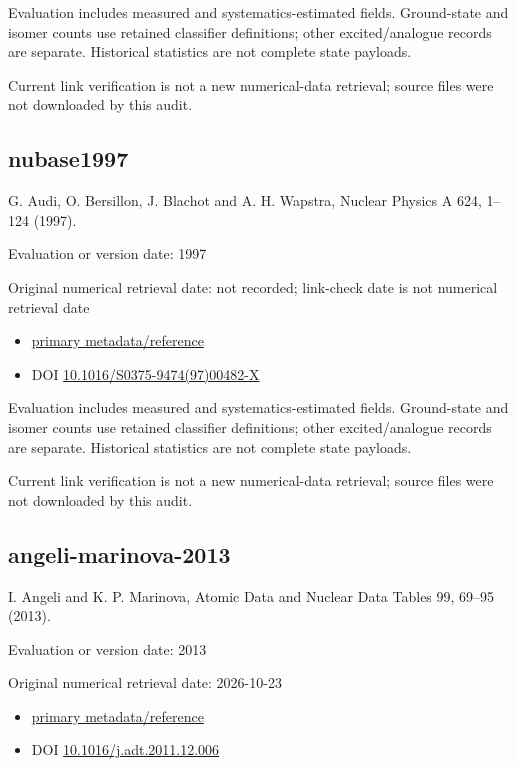 \documentclass[
  11pt,
  letterpaper,
]{article}
\providecommand{\tightlist}{%
  \setlength{\itemsep}{0pt}\setlength{\parskip}{0pt}}
\begin{document}
Evaluation includes measured and systematics-estimated fields.
Ground-state and isomer counts use retained classifier definitions;
other excited/analogue records are separate. Historical statistics are
not complete state payloads.

Current link verification is not a new numerical-data retrieval; source
files were not downloaded by this audit.

\subsection{nubase1997}\label{nubase1997}

G. Audi, O. Bersillon, J. Blachot and A. H. Wapstra, Nuclear Physics A
624, 1--124 (1997).

Evaluation or version date: 1997

Original numerical retrieval date: not recorded; link-check date is not
numerical retrieval date

\begin{itemize}
\tightlist
\item
  \href{https://www.sciencedirect.com/science/article/pii/S037594749700482X}{primary
  metadata/reference}
\item
  DOI
  \href{https://doi.org/10.1016/S0375-9474(97)00482-X}{10.1016/S0375-9474(97)00482-X}
\end{itemize}

Evaluation includes measured and systematics-estimated fields.
Ground-state and isomer counts use retained classifier definitions;
other excited/analogue records are separate. Historical statistics are
not complete state payloads.

Current link verification is not a new numerical-data retrieval; source
files were not downloaded by this audit.

\subsection{angeli-marinova-2013}\label{angeli-marinova-2013}

I. Angeli and K. P. Marinova, Atomic Data and Nuclear Data Tables 99,
69--95 (2013).

Evaluation or version date: 2013

Original numerical retrieval date: 2026-10-23

\begin{itemize}
\tightlist
\item
  \href{https://www-nds.iaea.org/radii/}{primary metadata/reference}
\item
  DOI
  \href{https://doi.org/10.1016/j.adt.2011.12.006}{10.1016/j.adt.2011.12.006}
\end{itemize}
\end{document}
